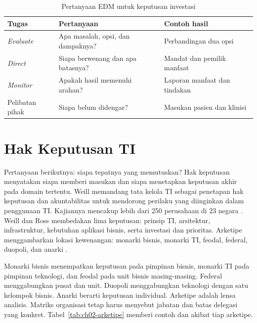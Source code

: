 \begin{table}[!htb]
  \centering\small
  \caption{Pertanyaan EDM untuk keputusan investasi}\label{tab:ch02-edm}
  \begin{tabularx}{\textwidth}{|>{\raggedright\arraybackslash}p{}|>{\raggedright\arraybackslash}X|>{\raggedright\arraybackslash}X|}
    \hline
    \textbf{Tugas} & \textbf{Pertanyaan} & \textbf{Contoh hasil} \\ \hline
    \textit{Evaluate} & Apa masalah, opsi, dan dampaknya? & Perbandingan dua opsi \\ \hline
    \textit{Direct} & Siapa berwenang dan apa batasnya? & Mandat dan pemilik manfaat \\
    \hline
    \textit{Monitor} & Apakah hasil memenuhi arahan? & Laporan manfaat dan tindakan \\
    \hline
    Pelibatan pihak & Siapa belum didengar? & Masukan pasien dan klinisi \\ \hline
  \end{tabularx}
\end{table}

\section{Hak Keputusan TI}

Pertanyaan berikutnya: siapa tepatnya yang memutuskan? Hak keputusan menyatakan siapa
memberi masukan dan siapa menetapkan keputusan akhir pada domain tertentu. Weill
memandang tata kelola TI sebagai penetapan hak keputusan dan akuntabilitas untuk mendorong
perilaku yang diinginkan dalam penggunaan TI. Kajiannya mencakup lebih dari 250 perusahaan
di 23 negara \cite{c02-weill-misqe}. Weill dan Ross membedakan lima keputusan: prinsip TI,
arsitektur, infrastruktur, kebutuhan aplikasi bisnis, serta investasi dan prioritas. Arketipe
menggambarkan lokasi kewenangan: monarki bisnis, monarki TI, feodal, federal, duopoli, dan
anarki \cite{weill2004,c02-weill-misqe}.

Monarki bisnis menempatkan keputusan pada pimpinan bisnis, monarki TI pada pimpinan
teknologi, dan feodal pada unit bisnis masing-masing. Federal menggabungkan pusat dan unit.
Duopoli menggabungkan teknologi dengan satu kelompok bisnis. Anarki berarti keputusan
individual. Arketipe adalah lensa analisis. Matriks organisasi tetap harus menyebut jabatan
dan batas delegasi yang konkret. Tabel~\ref{tab:ch02-arketipe} memberi contoh dan akibat
tiap arketipe.

